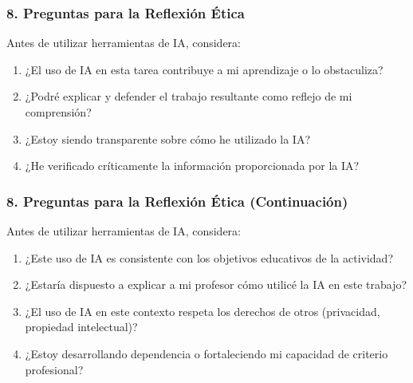 \documentclass{beamer}
\begin{document}
	\begin{frame}
		\frametitle{8. Preguntas para la Reflexión Ética}
		Antes de utilizar herramientas de IA, considera:
		\begin{enumerate}
			\item ¿El uso de IA en esta tarea contribuye a mi aprendizaje o lo obstaculiza?
			\item ¿Podré explicar y defender el trabajo resultante como reflejo de mi comprensión?
			\item ¿Estoy siendo transparente sobre cómo he utilizado la IA?
			\item ¿He verificado críticamente la información proporcionada por la IA?
		\end{enumerate}
	\end{frame}
	
	\begin{frame}
		\frametitle{8. Preguntas para la Reflexión Ética (Continuación)}
		Antes de utilizar herramientas de IA, considera:
		\begin{enumerate}[resume] %
			\item ¿Este uso de IA es consistente con los objetivos educativos de la actividad?
			\item ¿Estaría dispuesto a explicar a mi profesor cómo utilicé la IA en este trabajo?
			\item ¿El uso de IA en este contexto respeta los derechos de otros (privacidad, propiedad intelectual)?
			\item ¿Estoy desarrollando dependencia o fortaleciendo mi capacidad de criterio profesional?
		\end{enumerate}
	\end{frame}
	
\end{document}
